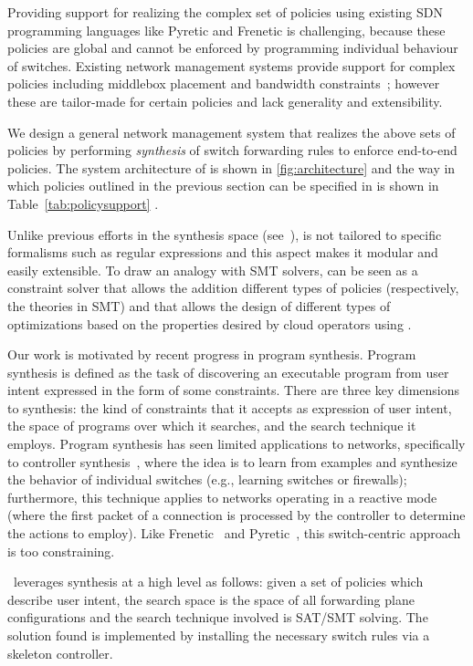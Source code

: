 


Providing support for realizing the complex set of policies using
existing SDN programming languages like Pyretic and Frenetic is
challenging, because these policies are global and cannot be enforced
by programming individual behaviour of switches. Existing network
management systems provide support for complex policies including
middlebox placement and bandwidth constraints~\cite{}; however these
are tailor-made for certain policies and lack generality and
extensibility.

We design a general network management system that realizes the above
sets of policies by performing {\em synthesis} of switch forwarding
rules to enforce end-to-end policies. The system architecture of \name
is shown in \cref{fig:architecture} and the way in which policies
outlined in the previous section can be specified in \name is shown in
Table~\ref{tab:policysupport} .

Unlike previous efforts in the synthesis space (see~\cite{}), \Name is
not tailored to specific formalisms such as regular expressions and
this aspect makes it modular and easily extensible.
To draw an analogy with SMT solvers, \Name can be seen as a constraint
solver that allows the addition different types of policies
(respectively, the theories in SMT) and that allows the design of
different types of optimizations based on the properties desired by cloud
  operators using \Name. 
  
Our work is motivated by recent progress in program synthesis.
Program synthesis is defined as the task of discovering an executable
program from user intent expressed in the form of some
constraints. There are three key dimensions to synthesis: the kind of
constraints that it accepts as expression of user intent, the space of
programs over which it searches, and the search technique it
employs. Program synthesis has seen limited applications to networks,
specifically to controller synthesis~\cite{netegg}, where the idea is
to learn from examples and synthesize the behavior of individual
switches (e.g., learning switches or firewalls); furthermore, this
technique applies to networks operating in a reactive mode (where the
first packet of a connection is processed by the controller to
determine the actions to employ). Like Frenetic~\cite{} and
Pyretic~\cite{}, this switch-centric approach is too constraining.

\Name\ leverages synthesis at a high level as follows: given a set of
policies which describe user intent, the search space is the space of
all forwarding plane configurations and the search technique involved
is SAT/SMT solving. The solution found is implemented by installing
the necessary switch rules via a skeleton controller.

